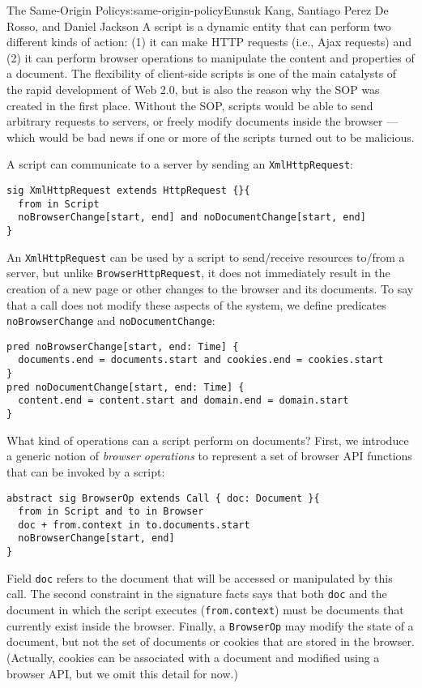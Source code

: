 \begin{aosachapter}{The Same-Origin Policy}{s:same-origin-policy}{Eunsuk Kang, Santiago Perez De Rosso, and Daniel Jackson}
A script is a dynamic entity that can perform two different kinds of
action: (1) it can make HTTP requests (i.e., Ajax requests) and (2) it
can perform browser operations to manipulate the content and properties
of a document. The flexibility of client-side scripts is one of the main
catalysts of the rapid development of Web 2.0, but is also the reason
why the SOP was created in the first place. Without the SOP, scripts
would be able to send arbitrary requests to servers, or freely modify
documents inside the browser --- which would be bad news if one or more
of the scripts turned out to be malicious.

A script can communicate to a server by sending an
\texttt{XmlHttpRequest}:

\begin{verbatim}
sig XmlHttpRequest extends HttpRequest {}{
  from in Script
  noBrowserChange[start, end] and noDocumentChange[start, end]
}
\end{verbatim}

An \texttt{XmlHttpRequest} can be used by a script to send/receive
resources to/from a server, but unlike \texttt{BrowserHttpRequest}, it
does not immediately result in the creation of a new page or other
changes to the browser and its documents. To say that a call does not
modify these aspects of the system, we define predicates
\texttt{noBrowserChange} and \texttt{noDocumentChange}:

\begin{verbatim}
pred noBrowserChange[start, end: Time] {
  documents.end = documents.start and cookies.end = cookies.start  
}
pred noDocumentChange[start, end: Time] {
  content.end = content.start and domain.end = domain.start  
}
\end{verbatim}

What kind of operations can a script perform on documents? First, we
introduce a generic notion of \emph{browser operations} to represent a
set of browser API functions that can be invoked by a script:

\begin{verbatim}
abstract sig BrowserOp extends Call { doc: Document }{
  from in Script and to in Browser
  doc + from.context in to.documents.start
  noBrowserChange[start, end]
}
\end{verbatim}

Field \texttt{doc} refers to the document that will be accessed or
manipulated by this call. The second constraint in the signature facts
says that both \texttt{doc} and the document in which the script
executes (\texttt{from.context}) must be documents that currently exist
inside the browser. Finally, a \texttt{BrowserOp} may modify the state
of a document, but not the set of documents or cookies that are stored
in the browser. (Actually, cookies can be associated with a document and
modified using a browser API, but we omit this detail for now.)


\end{aosachapter}
